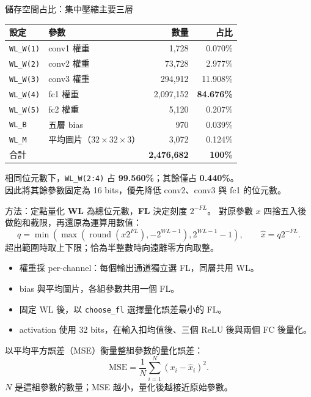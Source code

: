 \documentclass[aspectratio=169,11pt]{beamer}
\begin{document}
\begin{frame}{儲存空間占比：集中壓縮主要三層}
  \small
  \centering
  \begin{tabular}{llrr}
    \toprule
    設定 & 參數 & 數量 & 占比 \\
    \midrule
    \texttt{WL\_W(1)} & conv1 權重 & 1,728 & 0.070\% \\
    \texttt{WL\_W(2)} & conv2 權重 & 73,728 & 2.977\% \\
    \texttt{WL\_W(3)} & conv3 權重 & 294,912 & 11.908\% \\
    \texttt{WL\_W(4)} & fc1 權重 & 2,097,152 & \textbf{84.676\%} \\
    \texttt{WL\_W(5)} & fc2 權重 & 5,120 & 0.207\% \\
    \texttt{WL\_B} & 五層 bias & 970 & 0.039\% \\
    \texttt{WL\_M} & 平均圖片（$32\times32\times3$） & 3,072 & 0.124\% \\
    \midrule
    合計 & & \textbf{2,476,682} & \textbf{100\%} \\
    \bottomrule
  \end{tabular}

  \vspace{0.5em}
  \begin{flushleft}
    \footnotesize
    相同位元數下，\texttt{WL\_W(2:4)} 占 \textbf{99.560\%}；其餘僅占 \textbf{0.440\%}。\\
    因此將其餘參數固定為 16 bits，優先降低 conv2、conv3 與 fc1 的位元數。\\
  \end{flushleft}
\end{frame}

\begin{frame}{方法：定點量化}
  \small
  \textbf{WL} 為總位元數，\textbf{FL} 決定刻度 $2^{-FL}$。
  對原參數 $x$ 四捨五入後做飽和截限，再還原為運算用數值：
  \[
    q=\min\!\left(\max\!\left(\operatorname{round}(x2^{FL}),-2^{WL-1}\right),
    2^{WL-1}-1\right),\qquad \hat{x}=q2^{-FL}.
  \]
  超出範圍時取上下限；恰為半整數時向遠離零方向取整。

  \vspace{0.4em}
  \begin{itemize}
    \item 權重採 per-channel：每個輸出通道獨立選 FL，同層共用 WL。
    \item bias 與平均圖片，各組參數共用一個 FL。
    \item 固定 WL 後，以 \texttt{choose\_fl} 選擇量化誤差最小的 FL。
    \item activation 使用 32 bits，在輸入扣均值後、三個 ReLU 後與兩個 FC 後量化。
  \end{itemize}
  以平均平方誤差（MSE）衡量整組參數的量化誤差：
  \[
    \mathrm{MSE}=\frac{1}{N}\sum_{i=1}^{N}(x_i-\hat{x}_i)^2.
  \]
  $N$ 是這組參數的數量；MSE 越小，量化後越接近原始參數。
\end{frame}
\end{document}
